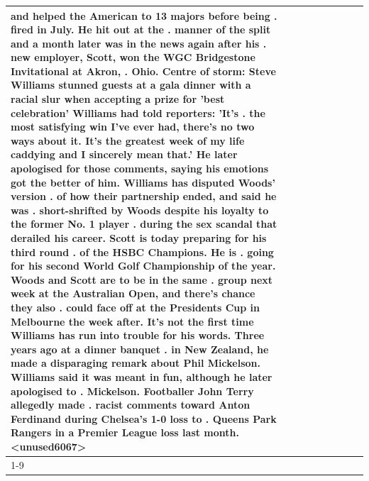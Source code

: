 \begin{table}[H]
\begin{tabular}{lllrlllll}
and helped the American to 13 majors before being . fired in July. He hit out at the . manner of the split and a month later was in the news again after his . new employer, Scott, won the WGC Bridgestone Invitational at Akron, . Ohio. Centre of storm: Steve Williams stunned guests at a gala dinner with a racial slur when accepting a prize for 'best celebration' Williams had told reporters: 'It's . the most satisfying win I've ever had, there's no two ways about it. It's the greatest week of my life caddying and I sincerely mean that.' He later apologised for those comments, saying his emotions got the better of him. Williams has disputed Woods' version . of how their partnership ended, and said he was . short-shrifted by Woods despite his loyalty to the former No. 1 player . during the sex scandal that derailed his career. Scott is today preparing for his third round . of the HSBC Champions. He is . going for his second World Golf Championship of the year. Woods and Scott are to be in the same . group next week at the Australian Open, and there's chance they also . could face off at the Presidents Cup in Melbourne the week after. It's not the first time Williams has run into trouble for his words. Three years ago at a dinner banquet . in New Zealand, he made a disparaging remark about Phil Mickelson. Williams said it was meant in fun, although he later apologised to . Mickelson. Footballer John Terry allegedly made . racist comments toward Anton Ferdinand during Chelsea's 1-0 loss to . Queens Park Rangers in a Premier League loss last month.<unused6067> \\
\cline{1-9}

\end{tabular}
\end{table}
